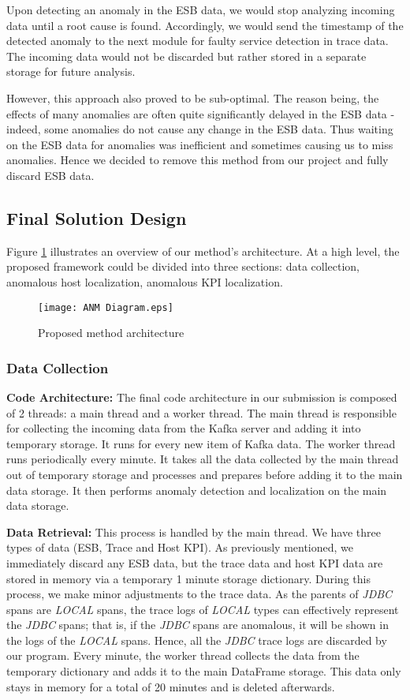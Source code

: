\documentclass[12pt]{article}
\begin{document}
\noindent Upon detecting an anomaly in the ESB data, we would stop analyzing incoming data until a root cause is found. Accordingly, we would send the timestamp of the detected anomaly to the next module for faulty service detection in trace data. The incoming data would not be discarded but rather stored in a separate storage for future analysis.


\noindent However, this approach also proved to be sub-optimal. The reason being, the effects of many anomalies are often quite significantly delayed in the ESB data - indeed, some anomalies do not cause any change in the ESB data. Thus waiting on the ESB data for anomalies was inefficient and sometimes causing us to miss anomalies. Hence we decided to remove this method from our project and fully discard ESB data.


\subsection{Final Solution Design}
\smallskip\smallskip
Figure \ref{fig:overview} illustrates an overview of our method's architecture. At a high level, the proposed framework could be divided into three sections: data collection, anomalous host localization, anomalous KPI localization.
\begin{figure}[H]
    \texttt{[image: ANM Diagram.eps]}
    \caption{Proposed method architecture}
    \label{fig:overview}
\end{figure}


\subsubsection{Data Collection}
\textbf{Code Architecture:} The final code architecture in our submission is composed of 2 threads: a main thread and a worker thread. The main thread is responsible for collecting the incoming data from the Kafka server and adding it into temporary storage. It runs for every new item of Kafka data. The worker thread runs periodically every minute. It takes all the data collected by the main thread out of temporary storage and processes and prepares before adding it to the main data storage. It then performs anomaly detection and localization on the main data storage.

\smallskip
\noindent\textbf{Data Retrieval:} This process is handled by the main thread. We have three types of data (ESB, Trace and Host KPI). As previously mentioned, we immediately discard any ESB data, but the trace data and host KPI data are stored in memory via a temporary 1 minute storage dictionary. During this process, we make minor adjustments to the trace data. As the parents of \textit{JDBC} spans are \textit{LOCAL} spans, the trace logs of \textit{LOCAL} types can effectively represent the \textit{JDBC} spans; that is, if the \textit{JDBC} spans are anomalous, it will be shown in the logs of the \textit{LOCAL} spans. Hence, all the \textit{JDBC} trace logs are discarded by our program. Every minute, the worker thread collects the data from the temporary dictionary and adds it to the main DataFrame storage. This data only stays in memory for a total of 20 minutes and is deleted afterwards.
\end{document}
